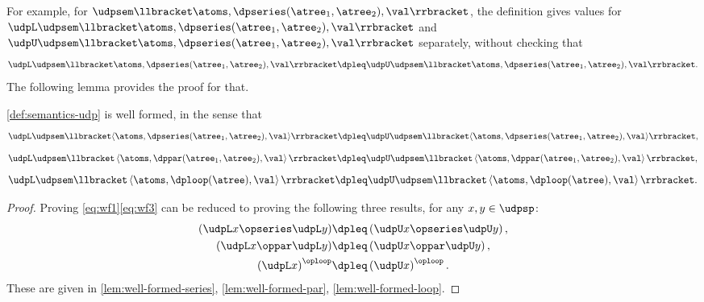 For example, for $\udpsem\llbracket\atoms,\dpseries(\atree_{1},\atree_{2}),\val\rrbracket$,
the definition gives values for~$\udpL\udpsem\llbracket\atoms,\dpseries(\atree_{1},\atree_{2}),\val\rrbracket$
and~$\udpU\udpsem\llbracket\atoms,\dpseries(\atree_{1},\atree_{2}),\val\rrbracket$
separately, without checking that
\[
    \udpL\udpsem\llbracket\atoms,\dpseries(\atree_{1},\atree_{2}),\val\rrbracket\dpleq\udpU\udpsem\llbracket\atoms,\dpseries(\atree_{1},\atree_{2}),\val\rrbracket.
\]
The following lemma provides the proof for that.
\begin{lemma}
    \label{lem:udpsem-well-formed}\cref{def:semantics-udp} is well
    formed, in the sense that {\small{}
    \begin{equation}
        \udpL\udpsem\llbracket\langle\atoms,\dpseries(\atree_{1},\atree_{2}),\val\rangle\rrbracket\dpleq\udpU\udpsem\llbracket\langle\atoms,\dpseries(\atree_{1},\atree_{2}),\val\rangle\rrbracket,\label{eq:wf1}
    \end{equation}
    \begin{equation}
        \udpL\udpsem\llbracket\left\langle \atoms,\dppar(\atree_{1},\atree_{2}),\val\right\rangle \rrbracket\dpleq\udpU\udpsem\llbracket\left\langle \atoms,\dppar(\atree_{1},\atree_{2}),\val\right\rangle \rrbracket,\label{eq:wf2}
    \end{equation}
    \begin{equation}
        \udpL\udpsem\llbracket\left\langle \atoms,\dploop(\atree),\val\right\rangle \rrbracket\dpleq\udpU\udpsem\llbracket\left\langle \atoms,\dploop(\atree),\val\right\rangle \rrbracket.\label{eq:wf3}
    \end{equation}
    }{\small \par}
\end{lemma}
\begin{proof}
    Proving \cref{eq:wf1}\textemdash \cref{eq:wf3} can be
    reduced to proving the following three results, for any $x,y\in\udpsp$:
    \begin{align*}
        \left(\udpL x\opseries\udpL y\right) & \dpleq\left(\udpU x\opseries\udpU y\right),\\
        \left(\udpL x\oppar\udpL y\right) & \dpleq\left(\udpU x\oppar\udpU y\right),\\
        \left(\udpL x\right)^{\oploop} & \dpleq\left(\udpU x\right)^{\oploop}.
    \end{align*}
    These are given in \cref{lem:well-formed-series}, \cref{lem:well-formed-par},
    \cref{lem:well-formed-loop}.
\end{proof}
